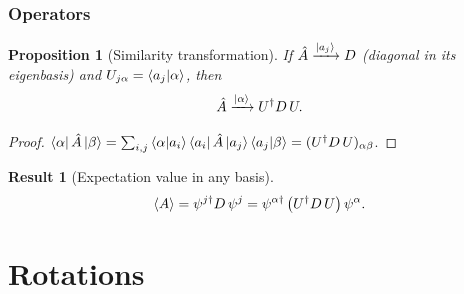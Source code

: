\documentclass{article}
\newtheorem{proposition}{Proposition}
\newtheorem{result}{Result}
\begin{document}
\subsubsection{Operators}
\begin{proposition}[Similarity transformation]
    If $\hat{A} \xrightarrow{\ket{a_j}} D$ (diagonal in its eigenbasis) and $U_{j\alpha} = \braket{a_j|\alpha}$, then
    \begin{equation}
        \hat{A} \xrightarrow{\ket{\alpha}} U^\dagger D\,U.
    \end{equation}
\end{proposition}
\begin{proof}
    $\bra{\alpha}\hat{A}\ket{\beta} = \sum_{i,j}\braket{\alpha|a_i}\bra{a_i}\hat{A}\ket{a_j}\braket{a_j|\beta} = (U^\dagger D\,U)_{\alpha\beta}$.
\end{proof}
\begin{result}[Expectation value in any basis]
    \begin{equation}
        \braket{A} = \psi^{j\dagger}D\,\psi^{j} = \psi^{\alpha\dagger}\left(U^\dagger D\,U\right)\psi^{\alpha}.
    \end{equation}
\end{result}


\section{Rotations}%
\end{document}
